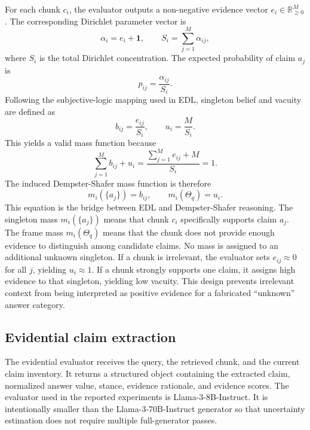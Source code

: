 \documentclass[preprint,12pt,authoryear,nopreprintline]{elsarticle}
\newcommand{\R}{\mathbb{R}}
\newcommand{\Frame}{\Theta}
\begin{document}
For each chunk $c_i$, the evaluator outputs a non-negative evidence vector $e_i\in\R_{\geq0}^{M}$. The corresponding Dirichlet parameter vector is
\begin{equation}
    \alpha_i=e_i+\mathbf{1}, \qquad S_i=\sum_{j=1}^{M}\alpha_{ij},
    \label{eq:dirichlet}
\end{equation}
where $S_i$ is the total Dirichlet concentration. The expected probability of claim $a_j$ is
\begin{equation}
    \hat{p}_{ij}=\frac{\alpha_{ij}}{S_i}.
    \label{eq:expected_prob}
\end{equation}
Following the subjective-logic mapping used in EDL, singleton belief and vacuity are defined as
\begin{equation}
    b_{ij}=\frac{e_{ij}}{S_i}, \qquad u_i=\frac{M}{S_i}.
    \label{eq:belief_vacuity}
\end{equation}
This yields a valid mass function because
\begin{equation}
    \sum_{j=1}^{M}b_{ij}+u_i=\frac{\sum_{j=1}^{M}e_{ij}+M}{S_i}=1.
    \label{eq:mass_validity}
\end{equation}
The induced Dempster-Shafer mass function is therefore
\begin{equation}
    m_i(\{a_j\})=b_{ij}, \qquad m_i(\Frame_q)=u_i.
    \label{eq:mass_function}
\end{equation}
This equation is the bridge between EDL and Dempster-Shafer reasoning. The singleton mass $m_i(\{a_j\})$ means that chunk $c_i$ specifically supports claim $a_j$. The frame mass $m_i(\Frame_q)$ means that the chunk does not provide enough evidence to distinguish among candidate claims. No mass is assigned to an additional unknown singleton. If a chunk is irrelevant, the evaluator sets $e_{ij}\approx0$ for all $j$, yielding $u_i\approx1$. If a chunk strongly supports one claim, it assigns high evidence to that singleton, yielding low vacuity. This design prevents irrelevant context from being interpreted as positive evidence for a fabricated ``unknown'' answer category.

\subsection{Evidential claim extraction}

The evidential evaluator receives the query, the retrieved chunk, and the current claim inventory. It returns a structured object containing the extracted claim, normalized answer value, stance, evidence rationale, and evidence scores. The evaluator used in the reported experiments is Llama-3-8B-Instruct. It is intentionally smaller than the Llama-3-70B-Instruct generator so that uncertainty estimation does not require multiple full-generator passes.
\end{document}
